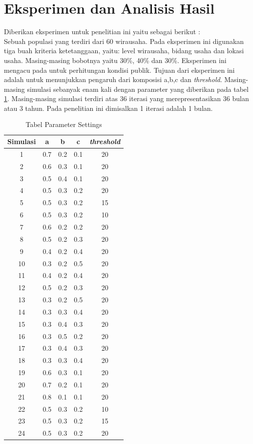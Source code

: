 \section{Eksperimen dan Analisis Hasil}
Diberikan eksperimen untuk penelitian ini yaitu sebagai berikut :\\
Sebuah populasi yang terdiri dari 60 wirausaha. Pada eksperimen ini digunakan tiga buah kriteria ketetanggaan, yaitu: level wirausaha, bidang usaha dan lokasi usaha. Masing-masing bobotnya yaitu 30\%, 40\% dan 30\%. Eksperimen ini mengacu pada \cite{GEM2013} untuk perhitungan kondisi publik. Tujuan dari eksperimen ini adalah untuk menunjukkan pengaruh dari komposisi a,b,c dan \textit{threshold}. Masing-masing simulasi sebanyak enam kali dengan parameter yang diberikan pada tabel \ref{tabelParameter}. Masing-masing simulasi terdiri atas 36 iterasi yang merepresentasikan 36 bulan atau 3 tahun. Pada penelitian ini dimisalkan 1 iterasi adalah 1 bulan.
\begin{table}[H]
\centering
\caption{Tabel Parameter Settings}
\begin{tabular}{|c|c|c|c|c|}
\hline
Simulasi & a & b & c & \textit{threshold}\\
\hline
1 & 0.7 & 0.2 & 0.1 & 20\\
\hline 
2 & 0.6 & 0.3 & 0.1 & 20\\
\hline
3 & 0.5 & 0.4 & 0.1 & 20\\
\hline
4 & 0.5 & 0.3 & 0.2 & 20\\
\hline
5 & 0.5 & 0.3 & 0.2 & 15\\
\hline
6 & 0.5 & 0.3 & 0.2 & 10\\
\hline
7 & 0.6 & 0.2 & 0.2 & 20\\
\hline
8 & 0.5 & 0.2 & 0.3 & 20\\
\hline
9 & 0.4 & 0.2 & 0.4 & 20\\
\hline 
10 & 0.3 & 0.2 & 0.5 & 20\\
\hline
11 & 0.4 & 0.2 & 0.4 & 20\\
\hline
12 & 0.5 & 0.2 & 0.3 & 20\\
\hline
13 & 0.3 & 0.2 & 0.5 & 20\\
\hline
14 & 0.3 & 0.3 & 0.4 & 20\\
\hline
15 & 0.3 & 0.4 & 0.3 & 20\\
\hline
16 & 0.3 & 0.5 & 0.2 & 20\\
\hline
17 & 0.3 & 0.4 & 0.3 & 20\\
\hline
18 & 0.3 & 0.3 & 0.4 & 20\\
\hline
19 & 0.6 & 0.3 & 0.1 & 20\\
\hline
20 & 0.7 & 0.2 & 0.1 & 20\\
\hline
21 & 0.8 & 0.1 & 0.1 & 20\\
\hline
22 & 0.5 & 0.3 & 0.2 & 10\\
\hline
23 & 0.5 & 0.3 & 0.2 & 15\\
\hline
24 & 0.5 & 0.3 & 0.2 & 20\\
\hline
\end{tabular}
\label{tabelParameter}
\end{table}
